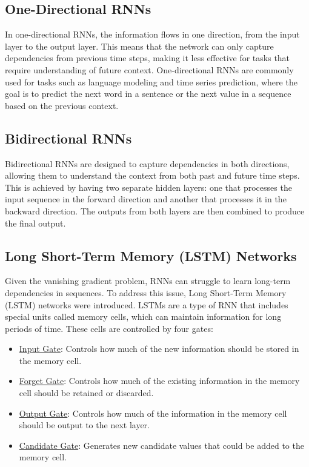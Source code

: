 \subsection{One-Directional RNNs}
In one-directional RNNs, the information flows in one direction, from the input layer to the output layer. This means that the network can only capture dependencies from previous time steps, making it less effective for tasks that require understanding of future context. One-directional RNNs are commonly used for tasks such as language modeling and time series prediction, where the goal is to predict the next word in a sentence or the next value in a sequence based on the previous context.

\subsection{Bidirectional RNNs}
Bidirectional RNNs are designed to capture dependencies in both directions, allowing them to understand the context from both past and future time steps. This is achieved by having two separate hidden layers: one that processes the input sequence in the forward direction and another that processes it in the backward direction. The outputs from both layers are then combined to produce the final output.

\subsection{Long Short-Term Memory (LSTM) Networks}

Given the vanishing gradient problem, RNNs can struggle to learn long-term dependencies in sequences. To address this issue, Long Short-Term Memory (LSTM) networks were introduced. LSTMs are a type of RNN that includes special units called memory cells, which can maintain information for long periods of time. These cells are controlled by four gates: 
\begin{itemize}
    \item \ul{Input Gate}: Controls how much of the new information should be stored in the memory cell.
    \item \ul{Forget Gate}: Controls how much of the existing information in the memory cell should be retained or discarded.
    \item \ul{Output Gate}: Controls how much of the information in the memory cell should be output to the next layer.
    \item \ul{Candidate Gate}: Generates new candidate values that could be added to the memory cell.
\end{itemize}

